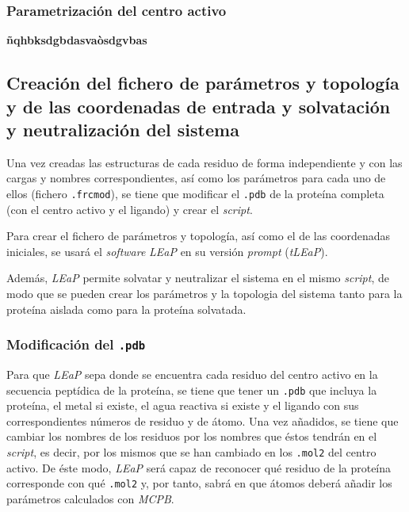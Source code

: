         \subsubsection{Parametrización del centro activo}
            \textbf{ñqhbksdgbdasvaòsdgvbas}
            
    \subsection{Creación del fichero de parámetros y topología y de las coordenadas de entrada y solvatación y neutralización del sistema}\label{sec:prmtopyinpcrd}
        Una vez creadas las estructuras de cada residuo de forma independiente y con las cargas y nombres correspondientes, así como los parámetros para cada uno de ellos (fichero \texttt{.frcmod}), se tiene que modificar el \texttt{.pdb} de la proteína completa (con el centro activo y el ligando) y crear el \textit{script}.\par
        Para crear el fichero de parámetros y topología, así como el de las coordenadas iniciales, se usará el \textit{software} \textit{LEaP} en su versión \textit{prompt} (\textit{tLEaP}). \par
        Además, \textit{LEaP} permite solvatar y neutralizar el sistema en el mismo \textit{script}, de modo que se pueden crear los parámetros y la topologia del sistema tanto para la proteína aislada como para la proteína solvatada.
        
        \subsubsection{Modificación del \texttt{.pdb}}
            Para que \textit{LEaP} sepa donde se encuentra cada residuo del centro activo en la secuencia peptídica de la proteína, se tiene que tener un \texttt{.pdb} que incluya la proteína, el metal si existe, el agua reactiva si existe y el ligando con sus correspondientes números de residuo y de átomo. Una vez añadidos, se tiene que cambiar los nombres de los residuos por los nombres que éstos tendrán en el \textit{script}, es decir, por los mismos que se han cambiado en los \texttt{.mol2} del centro activo. De éste modo, \textit{LEaP} será capaz de reconocer qué residuo de la proteína corresponde con qué \texttt{.mol2} y, por tanto, sabrá en que átomos deberá añadir los parámetros calculados con \textit{MCPB}.
            
